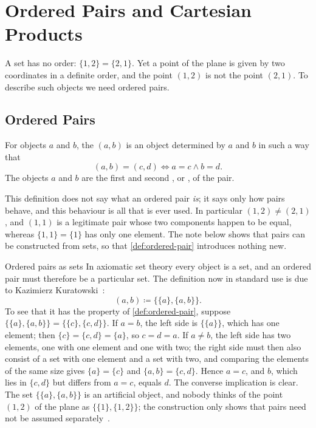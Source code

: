 \section{Ordered Pairs and Cartesian Products}
\label{sec:products}

A set has no order: $\{1,2\}=\{2,1\}$. Yet a point of the plane is given by two coordinates in a definite order, and the point $(1,2)$ is not the point $(2,1)$. To describe such objects we need ordered pairs.

\subsection{Ordered Pairs}

\begin{definition}
\label{def:ordered-pair}
For objects $a$ and $b$, the  $(a,b)$ is an object determined by $a$ and $b$ in such a way that
\[
(a,b)=(c,d)\iff a=c\wedge b=d .
\]
The objects $a$ and $b$ are the first and second , or , of the pair.
\end{definition}

This definition does not say what an ordered pair \emph{is}; it says only how pairs behave, and this behaviour is all that is ever used. In particular $(1,2)\ne(2,1)$, and $(1,1)$ is a legitimate pair whose two components happen to be equal, whereas $\{1,1\}=\{1\}$ has only one element. The note below shows that pairs can be constructed from sets, so that \cref{def:ordered-pair} introduces nothing new.

\begin{note}{Ordered pairs as sets}
In axiomatic set theory every object is a set, and an ordered pair must therefore be a particular set. The definition now in standard use is due to Kazimierz Kuratowski~\cite{kuratowski1921}:
\[
(a,b)\coloneqq\{\{a\},\{a,b\}\}.
\]
To see that it has the property of \cref{def:ordered-pair}, suppose $\{\{a\},\{a,b\}\}=\{\{c\},\{c,d\}\}$. If $a=b$, the left side is $\{\{a\}\}$, which has one element; then $\{c\}=\{c,d\}=\{a\}$, so $c=d=a$. If $a\ne b$, the left side has two elements, one with one element and one with two; the right side must then also consist of a set with one element and a set with two, and comparing the elements of the same size gives $\{a\}=\{c\}$ and $\{a,b\}=\{c,d\}$. Hence $a=c$, and $b$, which lies in $\{c,d\}$ but differs from $a=c$, equals $d$. The converse implication is clear. The set $\{\{a\},\{a,b\}\}$ is an artificial object, and nobody thinks of the point $(1,2)$ of the plane as $\{\{1\},\{1,2\}\}$; the construction only shows that pairs need not be assumed separately~\cite{enderton1977sets,halmos1960naive}.
\end{note}

